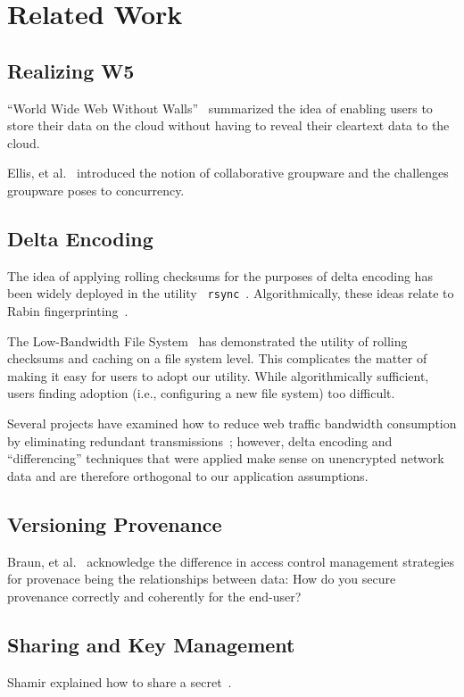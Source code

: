 \section{Related Work}

\subsection{Realizing W5}
``World Wide Web Without Walls''~\cite{w5} summarized the idea of enabling users to store their data
on the cloud without having to reveal their cleartext data to the
cloud.

Ellis, et al.~\cite{groupware} introduced the notion of collaborative
groupware and the challenges groupware poses to concurrency.

\subsection{Delta Encoding}
The idea of applying rolling checksums for the purposes of delta
encoding has been widely deployed in the utility {\tt
  rsync}~\cite{rsync}. Algorithmically, these ideas relate to Rabin
fingerprinting~\cite{rabinfp}.

The Low-Bandwidth File System~\cite{lbfs} has demonstrated the utility
of rolling checksums and caching on a file system level. This
complicates the matter of making it easy for users to adopt our
utility. While algorithmically sufficient, users finding adoption
(i.e., configuring a new file system) too difficult.

Several projects have examined how to reduce web traffic bandwidth
consumption by eliminating redundant transmissions~\cite{wetherall,
  webexpress}; however, delta encoding and ``differencing'' techniques
that were applied make sense on unencrypted network data and are
therefore orthogonal to our application assumptions. 

\subsection{Versioning Provenance}

Braun, et al.~\cite{securingprovenance} acknowledge the difference in
access control management strategies for provenace being the
relationships between data: How do you secure provenance correctly and
coherently for the end-user?

\subsection{Sharing and Key Management}
Shamir explained how to share a secret~\cite{shamir}.


